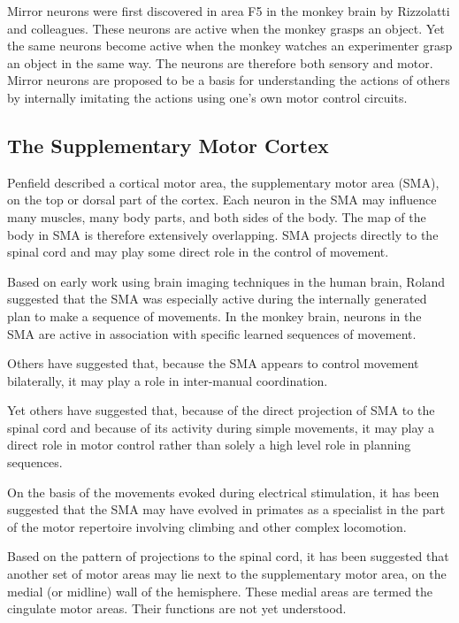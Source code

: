 \documentclass[]{book}
\begin{document}
Mirror neurons were first discovered in area F5 in the monkey brain by Rizzolatti and colleagues. These neurons are active when the monkey grasps an object. Yet the same neurons become active when the monkey watches an experimenter grasp an object in the same way. The neurons are therefore both sensory and motor. Mirror neurons are proposed to be a basis for understanding the actions of others by internally imitating the actions using one's own motor control circuits.

\hypertarget{the-supplementary-motor-cortex}{%
\subsection{The Supplementary Motor Cortex}\label{the-supplementary-motor-cortex}}

Penfield described a cortical motor area, the supplementary motor area (SMA), on the top or dorsal part of the cortex. Each neuron in the SMA may influence many muscles, many body parts, and both sides of the body. The map of the body in SMA is therefore extensively overlapping. SMA projects directly to the spinal cord and may play some direct role in the control of movement.

Based on early work using brain imaging techniques in the human brain, Roland suggested that the SMA was especially active during the internally generated plan to make a sequence of movements. In the monkey brain, neurons in the SMA are active in association with specific learned sequences of movement.

Others have suggested that, because the SMA appears to control movement bilaterally, it may play a role in inter-manual coordination.

Yet others have suggested that, because of the direct projection of SMA to the spinal cord and because of its activity during simple movements, it may play a direct role in motor control rather than solely a high level role in planning sequences.

On the basis of the movements evoked during electrical stimulation, it has been suggested that the SMA may have evolved in primates as a specialist in the part of the motor repertoire involving climbing and other complex locomotion.

Based on the pattern of projections to the spinal cord, it has been suggested that another set of motor areas may lie next to the supplementary motor area, on the medial (or midline) wall of the hemisphere. These medial areas are termed the cingulate motor areas. Their functions are not yet understood.
\end{document}
